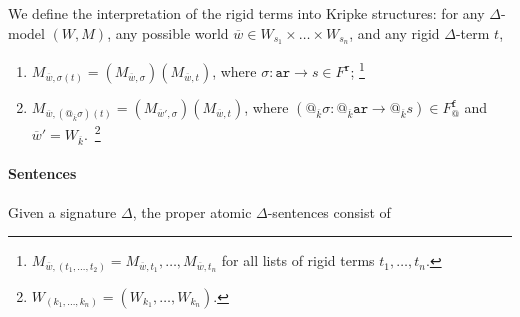 \documentclass{article}
\newcommand{\ari}{\mathtt{ar}}
\newcommand{\rigid}{\mathtt{r}}
\newcommand{\flexible}{\mathtt{f}}
\newcommand{\ok}{{\overline k}}
\newcommand{\ow}{{\overline w}}
\begin{document}
 We define the interpretation of the rigid terms into Kripke structures:
 for any $\Delta$-model $(W,M)$, any possible world $\ow\in W_{s_1}\times\dots\times W_{s_n}$, and any rigid $\Delta$-term $t$, 
 \begin{enumerate}
  \item $M_{\ow,\sigma(t)} = (M_{\ow,\sigma})(M_{\ow,t})$, where $\sigma\colon\ari\to s\in F^\rigid$;
  \footnote{$M_{\ow,(t_1,\ldots,t_2)}=M_{\ow,t_1},\ldots,M_{\ow,{t_n}}$ for all lists of rigid terms $t_1,\ldots,t_n$.}
  
   \item $M_{\ow,(@_\ok \sigma)(t)} = (M_{\ow',\sigma}) (M_{\ow,t})$, where $(@_\ok \sigma\colon @_\ok \ari\to @_\ok s)\in F_@^\flexible$ and $\ow'=W_{\ok}$.~\footnote{$W_{(k_1,\dots,k_n)}=(W_{k_1},\dots,W_{k_n})$.}
 \end{enumerate}

\paragraph{Sentences} 
Given a signature $\Delta$, the proper atomic $\Delta$-sentences consist of
 
\end{document}
